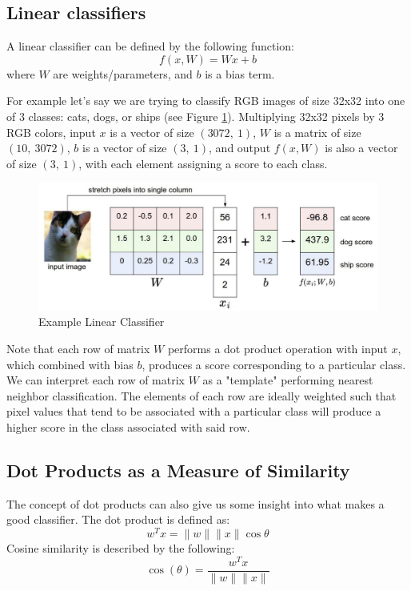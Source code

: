 \documentclass[twoside]{article}
\begin{document}
\subsection{Linear classifiers}

A linear classifier can be defined by the following function:
$$f(x, W) = W x + b $$
where $W$ are weights/parameters, and $b$ is a bias term.

For example let's say we are trying to classify RGB images of size 32x32 into one of 3 classes: cats, dogs, or ships (see Figure \ref{fig:cat_classifier}). Multiplying 32x32 pixels by 3 RGB colors, input $x$ is a vector of size $(3072,\ 1)$, $W$ is a matrix of size $(10,\ 3072)$, $b$ is a vector of size $(3,\ 1)$, and output $f(x, W)$ is also a vector of size $(3,\ 1)$, with each element assigning a score to each class.

\begin{figure}[!ht]%
    \centering
    \includegraphics[width=14cm]{cat_classifier}
    \caption{Example Linear Classifier}
    \label{fig:cat_classifier}%
\end{figure}

Note that each row of matrix $W$ performs a dot product operation with input $x$, which combined with bias $b$, produces a score corresponding to a particular class. We can interpret each row of matrix $W$ as a "template" performing nearest neighbor classification. The elements of each row are ideally weighted such that pixel values that tend to be associated with a particular class will produce a higher score in the class associated with said row.

\subsection{Dot Products as a Measure of Similarity}

The concept of dot products can also give us some insight into what makes a good classifier.
The dot product is defined as:
$$w^T x = \|w\| \|x\| \cos \theta$$
Cosine similarity is described by the following:
$$\cos(\theta) = \frac{w^Tx}{\| w \| \|x\|} $$
\end{document}

